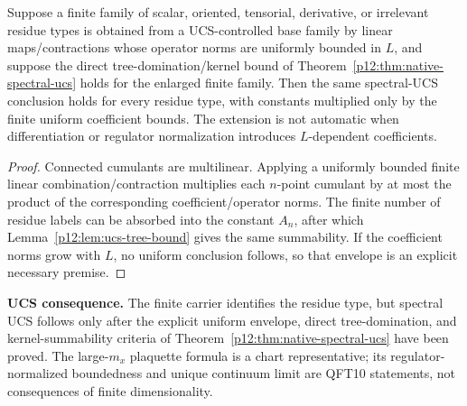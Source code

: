 \documentclass[12pt,a4paper]{article}
\begin{document}
\begin{corollary}
\label{p12:cor:tensor-oriented-ucs}
Suppose a finite family of scalar, oriented, tensorial, derivative, or irrelevant residue types is obtained from a UCS-controlled base family by linear maps/contractions whose operator norms are uniformly bounded in \(L\), and suppose the direct tree-domination/kernel bound of Theorem~\ref{p12:thm:native-spectral-ucs} holds for the enlarged finite family.  Then the same spectral-UCS conclusion holds for every residue type, with constants multiplied only by the finite uniform coefficient bounds.  The extension is not automatic when differentiation or regulator normalization introduces \(L\)-dependent coefficients.
\end{corollary}
\begin{proof}
Connected cumulants are multilinear.  Applying a uniformly bounded finite linear combination/contraction multiplies each \(n\)-point cumulant by at most the product of the corresponding coefficient/operator norms.  The finite number of residue labels can be absorbed into the constant \(A_n\), after which Lemma~\ref{p12:lem:ucs-tree-bound} gives the same summability.  If the coefficient norms grow with \(L\), no uniform conclusion follows, so that envelope is an explicit necessary premise.
\end{proof}


\textbf{UCS consequence.}
The finite carrier identifies the residue type, but spectral UCS follows only after the explicit uniform envelope, direct tree-domination, and kernel-summability criteria of Theorem~\ref{p12:thm:native-spectral-ucs} have been proved.  The large-\(m_x\) plaquette formula is a chart representative; its regulator-normalized boundedness and unique continuum limit are QFT10 statements, not consequences of finite dimensionality.
\end{document}
